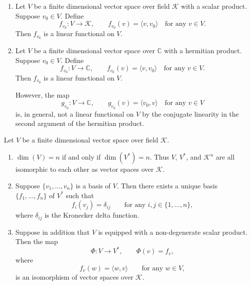 \documentclass{ctexart}
\begin{document}
    \begin{myex}
    \leavevmode
    \begin{enumerate}
        \item Let $V$ be a finite dimensional vector space over field $\mathcal{K}$ with a scalar product. Suppose $v_0\in V$. Define
        \[
        f_{v_0}:V\to \mathcal{K},\qquad f_{v_0}(v)=\langle v,v_0\rangle
        \quad \text{for any } v\in V.
        \]
        Then $f_{v_0}$ is a linear functional on $V$.

        \item Let $V$ be a finite dimensional vector space over $\mathbb{C}$ with a hermitian product. Suppose $v_0\in V$. Define
        \[
        f_{v_0}:V\to \mathbb{C},\qquad f_{v_0}(v)=\langle v,v_0\rangle
        \quad \text{for any } v\in V.
        \]
        Then $f_{v_0}$ is a linear functional on $V$.

        However, the map
        \[
        g_{v_0}:V\to \mathbb{C},\qquad g_{v_0}(v)=\langle v_0,v\rangle
        \quad \text{for any } v\in V
        \]
        is, in general, not a linear functional on $V$ by the conjugate linearity in the second argument of the hermitian product.
    \end{enumerate}
    \end{myex}

    \begin{mylma}
    Let $V$ be a finite dimensional vector space over field $\mathcal{K}$.
    \begin{enumerate}
        \item $\dim(V)=n$ if and only if $\dim(V^*)=n$. Thus $V$, $V^*$, and $\mathcal{K}^n$ are all isomorphic to each other as vector spaces over $\mathcal{K}$.

        \item Suppose $\{v_1,\dots,v_n\}$ is a basis of $V$. Then there exists a unique basis $\{f_1,\dots,f_n\}$ of $V^*$ such that
        \[
        f_i(v_j)=\delta_{ij}
        \qquad
        \text{for any } i,j\in\{1,\dots,n\},
        \]
        where $\delta_{ij}$ is the Kronecker delta function.

        \item Suppose in addition that $V$ is equipped with a non-degenerate scalar product. Then the map
        \[
        \Phi:V\to V^*,\qquad \Phi(v)=f_v,
        \]
        where
        \[
        f_v(w)=\langle w,v\rangle
        \qquad
        \text{for any } w\in V,
        \]
        is an isomorphism of vector spaces over $\mathcal{K}$.
    \end{enumerate}
    \end{mylma}
\end{document}
